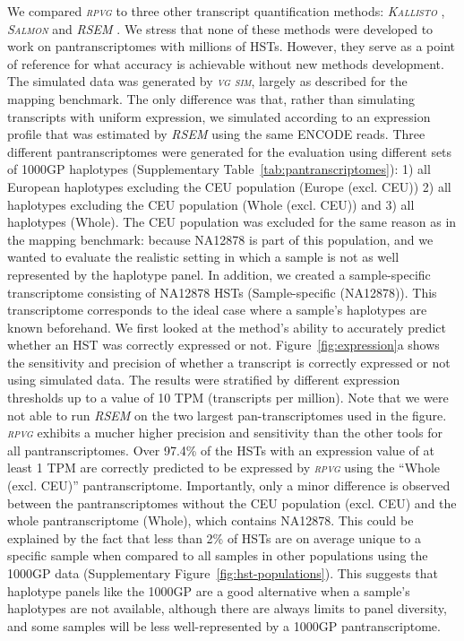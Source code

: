 \documentclass[11pt]{ucthesis}
\newcommand{\tool}[1]{\emph{\textsc{#1}}}
\begin{document}
We compared \tool{rpvg} to three other transcript quantification methods: \tool{Kallisto} \cite{bray2016near}, \tool{Salmon} \cite{patro2017salmon} and \tool{RSEM} \cite{li2011rsem}. We stress that none of these methods were developed to work on pantranscriptomes with millions of HSTs. However, they serve as a point of reference for what accuracy is achievable without new methods development. The simulated data was generated by \tool{vg sim}, largely as described for the mapping benchmark. The only difference was that, rather than simulating transcripts with uniform expression, we simulated according to an expression profile that was estimated by \tool{RSEM} using the same ENCODE reads. Three different pantranscriptomes were generated for the evaluation using different sets of 1000GP haplotypes (Supplementary Table~\ref{tab:pantranscriptomes}): 1) all European haplotypes excluding the CEU population (Europe (excl. CEU)) 2) all haplotypes excluding the CEU population (Whole (excl. CEU)) and 3) all haplotypes (Whole). The CEU population was excluded for the same reason as in the mapping benchmark: because NA12878 is part of this population, and we wanted to evaluate the realistic setting in which a sample is not as well represented by the haplotype panel. In addition, we created a sample-specific transcriptome consisting of NA12878 HSTs (Sample-specific (NA12878)). This transcriptome corresponds to the ideal case where a sample's haplotypes are known beforehand. 
\newline 
\newline
We first looked at the method's ability to accurately predict whether an HST was correctly expressed or not. Figure~\ref{fig:expression}a shows the sensitivity and precision of whether a transcript is correctly expressed or not using simulated data. The results were stratified by different expression thresholds up to a value of 10 TPM (transcripts per million). Note that we were not able to run \tool{RSEM} on the two largest pan-transcriptomes used in the figure. \tool{rpvg} exhibits a mucher higher precision and sensitivity than the other tools for all pantranscriptomes. Over 97.4\% of the HSTs with an expression value of at least 1 TPM are correctly predicted to be expressed by \tool{rpvg} using the ``Whole (excl. CEU)'' pantranscriptome. Importantly, only a minor difference is observed between the pantranscriptomes without the CEU population (excl. CEU) and the whole pantranscriptome (Whole), which contains NA12878. This could be explained by the fact that less than 2\% of HSTs are on average unique to a specific sample when compared to all samples in other populations using the 1000GP data (Supplementary Figure~\ref{fig:hst-populations}). This suggests that haplotype panels like the 1000GP are a good alternative when a sample's haplotypes are not available, although there are always limits to panel diversity, and some samples will be less well-represented by a 1000GP pantranscriptome. 
\end{document}
